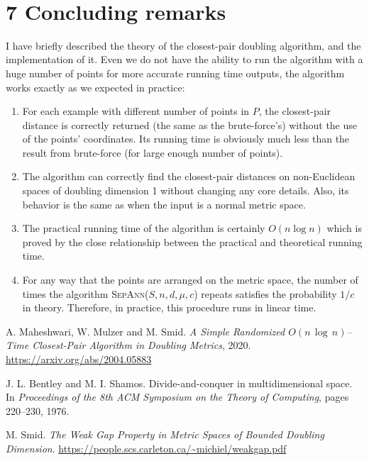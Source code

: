 \documentclass[12pt,english,]{article}
\providecommand{\tightlist}{%
  \setlength{\itemsep}{0pt}\setlength{\parskip}{0pt}}
\begin{document}
~

\hypertarget{section7}{%
\section{\texorpdfstring{7 \enspace Concluding
remarks}{7 Concluding remarks}}\label{section7}}

I have briefly described the theory of the closest-pair doubling
algorithm, and the implementation of it. Even we do not have the ability
to run the algorithm with a huge number of points for more accurate
running time outputs, the algorithm works exactly as we expected in
practice:

\begin{enumerate}
\def\labelenumi{\arabic{enumi}.}
\tightlist
\item
  For each example with different number of points in \(P\), the
  closest-pair distance is correctly returned (the same as the
  brute-force's) without the use of the points' coordinates. Its running
  time is obviously much less than the result from brute-force (for
  large enough number of points).
\item
  The algorithm can correctly find the closest-pair distances on
  non-Euclidean spaces of doubling dimension 1 without changing any core
  details. Also, its behavior is the same as when the input is a normal
  metric space.
\item
  The practical running time of the algorithm is certainly
  \(O(n\log n)\) which is proved by the close relationship between the
  practical and theoretical running time.
\item
  For any way that the points are arranged on the metric space, the
  number of times the algorithm \textsc{SepAnn($S,n,d,\mu,c$)} repeats
  satisfies the probability \(1/c\) in theory. Therefore, in practice,
  this procedure runs in linear time.
\end{enumerate}

\begin{thebibliography}{9}
A. Maheshwari, W. Mulzer and M. Smid. \emph{A Simple Randomized $O(n\,\log\,n)$–Time Closest-Pair Algorithm in Doubling Metrics}, 2020. \url{https://arxiv.org/abs/2004.05883}

J. L. Bentley and M. I. Shamos. Divide-and-conquer in multidimensional space. In \emph{Proceedings of the 8th ACM Symposium on the Theory of Computing}, pages 220–230,
1976.

M. Smid. \emph{The Weak Gap Property in Metric Spaces of Bounded Doubling Dimension}. \url{https://people.scs.carleton.ca/~michiel/weakgap.pdf}

\end{thebibliography}
\end{document}
